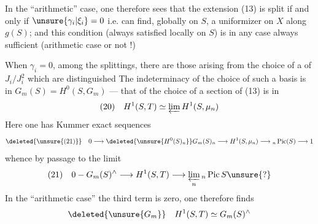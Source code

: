In the ``arithmetic'' case, one therefore sees that the extension (13) is split if and only if $\unsure{\gamma_i|\xi_i}=0$ i.e.  can find, globally on $S$, a uniformizer on $X$ along $g(S)$; and this condition (always satisfied locally on $S$) is in any case always sufficient (arithmetic case or not !)

When $\gamma_i=0$, among the splittings, there are those arising from the choice of a  of $J_i/J_i^2$ which are distinguished The indeterminacy of the choice of such a basis is in $G_m(S)=H^0(S,G_m)$ --- that of the choice of a section of (13) is in
\[
(20)\quad H^1(S,T)\simeq\varprojlim H^1(S,\mu_n)
\]
Here one has Kummer exact sequences
\[
\deleted{\unsure{(21)}}\quad 0\longrightarrow\deleted{\unsure{H^0(S)_n}}G_m(S)_n\longrightarrow H^1(S,\mu_n)\longrightarrow{}_n\operatorname{Pic}(S)\longrightarrow1
\]
whence by passage to the limit
\[
(21)\quad 0-G_m(S)^\wedge\longrightarrow H^1(S,T)\longrightarrow\varprojlim_n{}_n\operatorname{Pic}S\unsure{?}
\]
In the ``arithmetic case'' the third term is zero, one therefore finds
\[
\deleted{\unsure{G_m}}\quad H^1(S,T)\simeq G_m(S)^\wedge
\]
